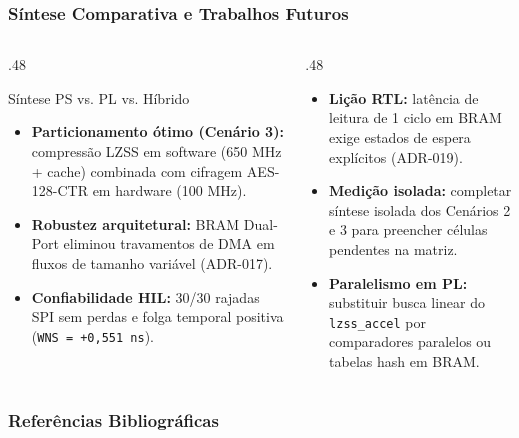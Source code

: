 \documentclass[../main.tex]{subfiles}
\begin{document}

\begin{frame}
  \frametitle{S\'intese Comparativa e Trabalhos Futuros}
  \begin{columns}[T]
    \begin{column}{.48\textwidth}
      \begin{block}{S\'intese PS vs. PL vs. H\'ibrido}
        \begin{itemize}
          \item \textbf{Particionamento \'otimo (Cen\'ario 3):} compress\~ao LZSS em software (650 MHz + cache) combinada com cifragem AES-128-CTR em hardware (100 MHz).
          \item \textbf{Robustez arquitetural:} BRAM Dual-Port eliminou travamentos de DMA em fluxos de tamanho vari\'avel (ADR-017).
          \item \textbf{Confiabilidade HIL:} 30/30 rajadas SPI sem perdas e folga temporal positiva (\texttt{WNS = +0,551 ns}).
        \end{itemize}
      \end{block}
    \end{column}
    \begin{column}{.48\textwidth}
      \begin{pontoschave}
        \begin{itemize}
          \item \textbf{Li\c{c}\~ao RTL:} lat\^encia de leitura de 1 ciclo em BRAM exige estados de espera expl\'icitos (ADR-019).
          \item \textbf{Medi\c{c}\~ao isolada:} completar s\'intese isolada dos Cen\'arios 2 e 3 para preencher c\'elulas pendentes na matriz.
          \item \textbf{Paralelismo em PL:} substituir busca linear do \texttt{lzss\_accel} por comparadores paralelos ou tabelas hash em BRAM.
        \end{itemize}
      \end{pontoschave}
    \end{column}
  \end{columns}
\end{frame}

\begin{frame}[allowframebreaks]
  \frametitle{Refer\^encias Bibliogr\'aficas}
  \nocite{*}
  \printbibliography
\end{frame}
\end{document}
